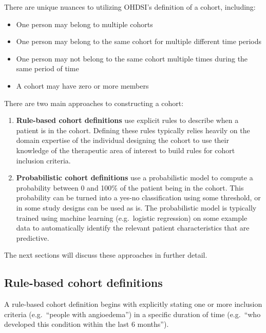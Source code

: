 \documentclass[11pt]{book}
\providecommand{\tightlist}{%
  \setlength{\itemsep}{0pt}\setlength{\parskip}{0pt}}
\theoremstyle{definition}
\theoremstyle{definition}
\theoremstyle{definition}
\theoremstyle{remark}
\begin{document}
There are unique nuances to utilizing OHDSI's definition of a cohort, including:

\begin{itemize}
\tightlist
\item
  One person may belong to multiple cohorts
\item
  One person may belong to the same cohort for multiple different time periods
\item
  One person may not belong to the same cohort multiple times during the same period of time
\item
  A cohort may have zero or more members
\end{itemize}

There are two main approaches to constructing a cohort:

\begin{enumerate}
\def\labelenumi{\arabic{enumi}.}
\tightlist
\item
  \textbf{Rule-based cohort definitions} use explicit rules to describe when a patient is in the cohort. Defining these rules typically relies heavily on the domain expertise of the individual designing the cohort to use their knowledge of the therapeutic area of interest to build rules for cohort inclusion criteria.
\item
  \textbf{Probabilistic cohort definitions} use a probabilistic model to compute a probability between 0 and 100\% of the patient being in the cohort. This probability can be turned into a yes-no classification using some threshold, or in some study designs can be used as is. The probabilistic model is typically trained using machine learning (e.g.~logistic regression) on some example data to automatically identify the relevant patient characteristics that are predictive.
\end{enumerate}

The next sections will discuss these approaches in further detail.

\hypertarget{rule-based-cohort-definitions}{%
\subsection{Rule-based cohort definitions}\label{rule-based-cohort-definitions}}

A rule-based cohort definition begins with explicitly stating one or more inclusion criteria (e.g.~``people with angioedema'') in a specific duration of time (e.g.~``who developed this condition within the last 6 months''). 
\end{document}
